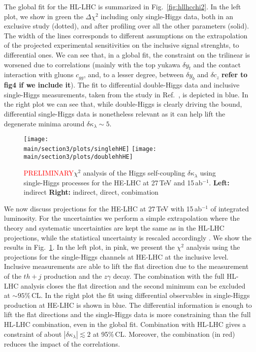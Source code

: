 The global fit for the HL-LHC is summarized in Fig.~\ref{fig:hllhcchi2}. In the left plot, we show in green the $\Delta\chi^2$ including only single-Higgs data, both in an exclusive study (dotted), and after profiling over all the other parameters (solid). The width of the lines corresponds to different assumptions on the extrapolation of the projected experimental sensitivities on the inclusive signal strenghts, to differential ones. We can see that, in a global fit, the constraint on the trilinear is worsened due to correlations (mainly with the top yukawa $\delta y_t$ and the contact interaction with gluons $c_{gg}$, and, to a lesser degree, between $\delta y_b$ and $\delta c_z$ \textbf{refer to fig4 if we include it}). The fit to differential double-Higgs data and inclusive single-Higgs measurements, taken from the study in Ref.~\cite{Azatov:2015oxa}, is depicted in blue. In the right plot we can see that, while double-Higgs is clearly driving the bound, differential single-Higgs data is nonetheless relevant as it can help lift the degenerate minima around $\delta \kappa_\lambda\sim 5$.
\medskip


\begin{figure}
	\centering
	\texttt{[image: \\main/section3/plots/singlehHE]}\hfill
	\texttt{[image: \\main/section3/plots/doublehhHE]}
	\caption{\textcolor{red}{PRELIMINARY}$\chi^2$ analysis of the Higgs self-coupling $\delta \kappa_\lambda$ using single-Higgs processes for the HE-LHC at 27\,TeV and 15\,ab$^{-1}$. \textbf{Left:} indirect \textbf{Right:} indirect, direct, conbimation}
	\label{fig:helhcchi2}
\end{figure}	


We now discuss projections for the HE-LHC at 27\,TeV with 15\,ab$^{-1}$ of integrated luminosity. For the uncertainties we perform a simple extrapolation where the theory and systematic uncertainties are kept the same as in the HL-LHC projections, while the statistical uncertainty is rescaled accordingly \cite{Goncalves:2018qas}. We show the results in Fig.~\ref{fig:helhcchi2}. In the left plot, in pink, we present the $\chi^2$ analysis using the projections for the single-Higgs channels at HE-LHC at the inclusive level. Inclusive measurements are able to lift the flat direction due to the measurement of the $th+j$ production and the $z\gamma$ decay. The combination with the full HL-LHC analysis closes the flat direction and the second minimum can be excluded at $\sim 95\%$\,CL. In the right plot the fit using differential observables in single-Higgs production at HE-LHC is shown in blue. The differential information is enough to lift the flat directions and the single-Higgs data is more constraining than the full HL-LHC combination, even in the global fit. Combination with HL-LHC gives a constraint of about $|\delta \kappa_\lambda |\lesssim  2$ at 95\%\,CL. Moreover, the combination (in red) reduces the impact of the correlations.
\medskip

